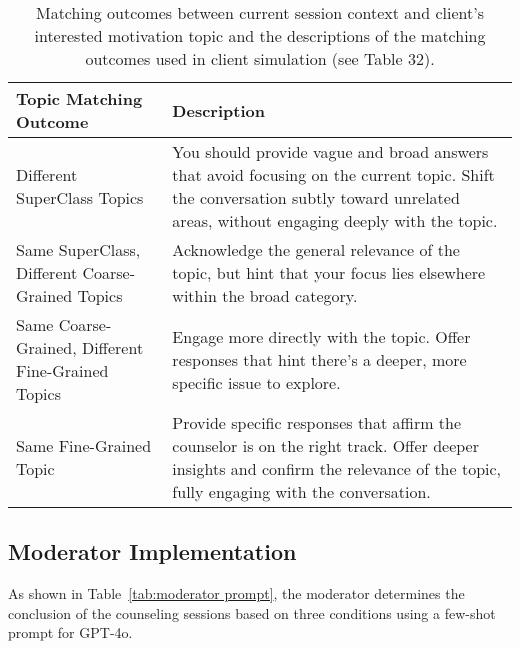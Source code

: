 \begin{table*}[tb]
\centering
\begin{tabularx}{\textwidth}{lX}
\toprule
Topic Matching Outcome          & Description                                                                                                                                      \\ \midrule
Different SuperClass Topics        & You should provide vague and broad answers that avoid focusing on the current topic. Shift the conversation subtly toward unrelated areas, without engaging deeply with the topic.                      \\ \hline
Same SuperClass, Different Coarse-Grained Topics    & Acknowledge the general relevance of the topic, but hint that your focus lies elsewhere within the broad category.                                       \\ \hline
Same Coarse-Grained, Different Fine-Grained Topics       & Engage more directly with the topic. Offer responses that hint there’s a deeper, more specific issue to explore.                                                  \\ \hline
Same Fine-Grained Topic    & Provide specific responses that affirm the counselor is on the right track. Offer deeper insights and confirm the relevance of the topic, fully engaging with the conversation.                \\ \bottomrule
\end{tabularx}
\caption{Matching outcomes between current session context and client's interested motivation topic and the descriptions of the matching outcomes used in client simulation (see Table 32).}
\label{tab:engagement description}
\end{table*}


\subsection{Moderator Implementation}

As shown in Table~\ref{tab:moderator prompt}, the moderator determines the conclusion of the counseling sessions based on three conditions using a few-shot prompt for GPT-4o.

